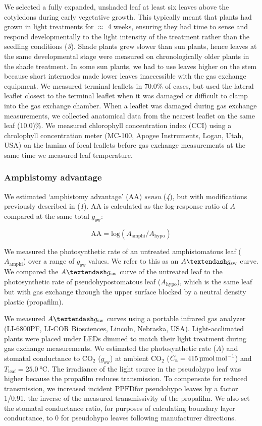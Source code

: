 \documentclass[
  letterpaper,
  DIV=11,
  numbers=noendperiod]{scrartcl}
\newcommand{\aax}{$\mathrm{AA}$}
\newcommand{\Aamphi}{$A_{\mathrm{amphi}}$}
\newcommand{\Ahypo}{$A_{\mathrm{hypo}}$}
\newcommand{\agcurve}{$A \textendash g_\text{sw}$}
\newcommand{\caequals}[1]{$C_\mathrm{a} = \qty{#1}{\micro\mol\raiseto{-1}\mol}$}
\newcommand{\gsw}{$g_\text{sw}$}
\newcommand{\ppfd}{$\mathrm{PPFD}$}
\newcommand{\tleafequals}[1]{$T_\mathrm{leaf} = \qty{#1}{\degreeCelsius}$}
\begin{document}
We selected a fully expanded, unshaded leaf at least six leaves above
the cotyledons during early vegetative growth. This typically meant that
plants had grown in light treatments for \(\approx\) 4 weeks, ensuring
they had time to sense and respond developmentally to the light
intensity of the treatment rather than the seedling conditions
(\emph{3}). Shade plants grew slower than sun plants, hence leaves at
the same developmental stage were measured on chronologically older
plants in the shade treatment. In some sun plants, we had to use leaves
higher on the stem because short internodes made lower leaves
inaccessible with the gas exchange equipment. We measured terminal
leaflets in 70.0\% of cases, but used the lateral leaflet closest to the
terminal leaflet when it was damaged or difficult to clamp into the gas
exchange chamber. When a leaflet was damaged during gas exchange
measurements, we collected anatomical data from the nearest leaflet on
the same leaf (10.0)\%. We measured chlorophyll concentration index
(CCI) using a chrolophyll concentration meter (MC-100, Apogee
Instruments, Logan, Utah, USA) on the lamina of focal leaflets before
gas exchange measurements at the same time we measured leaf temperature.

\subsubsection{Amphistomy advantage}\label{amphistomy-advantage}

We estimated `amphistomy advantage' (\aax) \emph{sensu} (\emph{4}), but
with modifications previously described in (\emph{1}). \aax{} is
calculated as the log-response ratio of \(A\) compared at the same total
\gsw:

\[\mathrm{AA} = \mathrm{log}(A_{\mathrm{amphi}} / A_{\mathrm{hypo}})\]

We measured the photosynthetic rate of an untreated amphistomatous leaf
(\Aamphi) over a range of \gsw{} values. We refer to this as an
\agcurve{} curve. We compared the \agcurve{} curve of the untreated leaf
to the photosynthetic rate of pseudohypostomatous leaf (\Ahypo), which
is the same leaf but with gas exchange through the upper surface blocked
by a neutral density plastic (propafilm).

We measured \agcurve{} curves using a portable infrared gas analyzer
(LI-6800PF, LI-COR Biosciences, Lincoln, Nebraska, USA).
Light-acclimated plants were placed under LEDs dimmed to match their
light treatment during gas exchange measurements. We estimated the
photosynthetic rate (\(A\)) and stomatal conductance to CO\(_2\) (\gsw)
at ambient CO\(_2\) (\caequals{415}) and \tleafequals{25.0}. The
irradiance of the light source in the pseudohypo leaf was higher because
the propafilm reduces transmission. To compensate for reduced
transmission, we increased incident \ppfd for pseudohypo leaves by a
factor 1/0.91, the inverse of the measured transmissivity of the
propafilm. We also set the stomatal conductance ratio, for purposes of
calculating boundary layer conductance, to 0 for pseudohypo leaves
following manufacturer directions.
\end{document}

